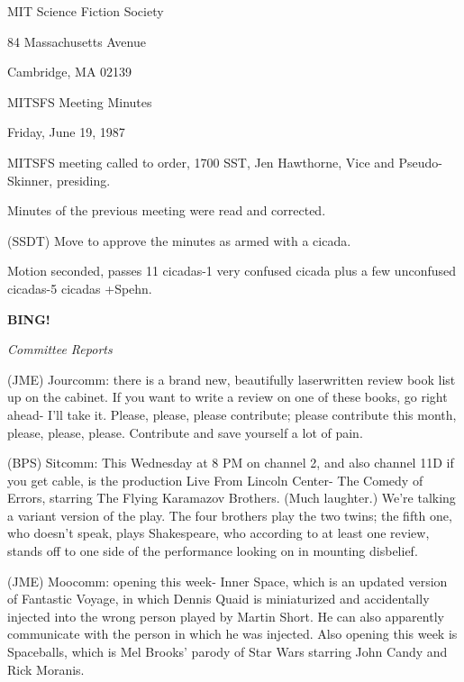 \documentclass[12pt]{article}
\newcommand{\bing}{{\bf BING!} }
\newcommand{\goto}[1]{\bing \vskip 12pt \centerline{{\em{#1}}}}
\begin{document}
\begin{center}

MIT Science Fiction Society 

84 Massachusetts Avenue

Cambridge, MA 02139

\vspace{12pt}

MITSFS Meeting Minutes 

Friday, June 19, 1987

\end{center}
 
\vspace{18pt}

\setlength{\parskip}{6pt}

\noindent
MITSFS meeting called to order, 1700 SST,
Jen Hawthorne, Vice and Pseudo-Skinner, presiding.

Minutes of the previous meeting were read and corrected.

(SSDT) Move to approve the minutes as armed with a cicada.

Motion seconded, passes 11 cicadas-1 very confused cicada plus a few unconfused cicadas-5 cicadas +Spehn.

\goto{Committee Reports}

(JME) Jourcomm: there is a brand new, beautifully laserwritten review book list up on the cabinet. If you want to write a review on one of these books, go right ahead- I'll take it. Please, please, please contribute; please contribute this month, please, please, please. Contribute and save yourself a lot of pain.

(BPS) Sitcomm: This Wednesday at 8 PM on channel 2, and also channel 11D if you get cable, is the production Live From Lincoln Center- The Comedy of Errors, starring The Flying Karamazov Brothers. (Much laughter.) We're talking a variant version of the play. The four brothers play the two twins; the fifth one, who doesn't speak, plays Shakespeare, who according to at least one review, stands off to one side of the performance looking on in mounting disbelief.

(JME) Moocomm: opening this week- Inner Space, which is an updated version of Fantastic Voyage, in which Dennis Quaid is miniaturized and accidentally injected into the wrong person played by Martin Short. He can also apparently communicate with the person in which he was injected. Also opening this week is Spaceballs, which is Mel Brooks' parody of Star Wars starring John Candy and Rick Moranis.
\end{document}

